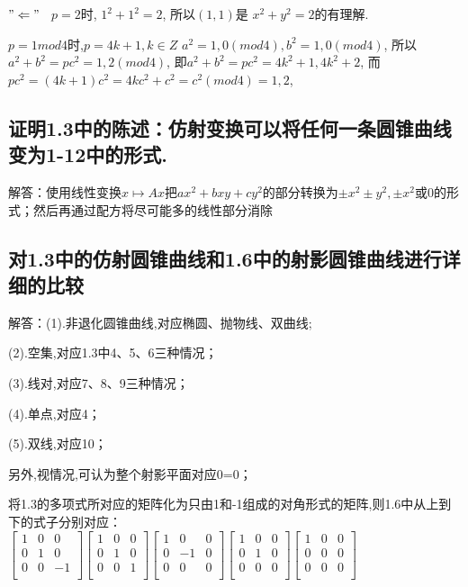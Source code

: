 \documentclass[UTF8]{book}
\begin{document}
			$"\Leftarrow"$ \ $ p=2 $时, $1^{2}+1^{2}=2$, 所以$ (1,1) $是 $x^{2}+y^{2}=2$的有理解.
			
			$ p=1mod  4 $时,$ p=4k+1 , k \in Z$
			$a^{2}=1,0(mod 4),b^{2}=1,0(mod 4)$, 所以$a^{2}+b^{2}=pc^{2}=1,2(mod 4)$,
			即$a^{2}+b^{2}=pc^{2}=4k^{2}+1,4k^{2}+2$, 而$pc^{2}=(4k+1)c^{2}=4kc^{2}+c^{2}=c^{2}(mod 4)=1,2$,
		\subsection{证明1.3中的陈述：仿射变换可以将任何一条圆锥曲线变为1-12中的形式.}
		
		
			解答：使用线性变换$ x \mapsto Ax $把$ax^{2}+bxy+cy^{2}$的部分转换为$\pm x^{2} \pm y^{2},\pm x^{2}$或0的形式；然后再通过配方将尽可能多的线性部分消除
		\subsection{对1.3中的仿射圆锥曲线和1.6中的射影圆锥曲线进行详细的比较}
			解答：(1).非退化圆锥曲线,对应椭圆、抛物线、双曲线;
			
			
			(2).空集,对应1.3中4、5、6三种情况；
			
			
			(3).线对,对应7、8、9三种情况；
			
			
			(4).单点,对应4；
			
			
			(5).双线,对应10；
			
			
			另外,视情况,可认为整个射影平面对应0=0；
			
			
			将1.3的多项式所对应的矩阵化为只由1和-1组成的对角形式的矩阵,则1.6中从上到下的式子分别对应：
			$\begin{bmatrix}
			    1&0&0\\
			    0&1&0\\
			    0&0&-1\\
			\end{bmatrix}
			\begin{bmatrix}
			    1&0&0\\
			    0&1&0\\
			    0&0&1\\
			\end{bmatrix}
			\begin{bmatrix}
			    1&0&0\\
			    0&-1&0\\
			    0&0&0\\
			\end{bmatrix}
			\begin{bmatrix}
			    1&0&0\\
			    0&1&0\\
			    0&0&0\\
			\end{bmatrix}
			\begin{bmatrix}
			    1&0&0\\
			    0&0&0\\
			    0&0&0\\
			\end{bmatrix}$
\end{document}
